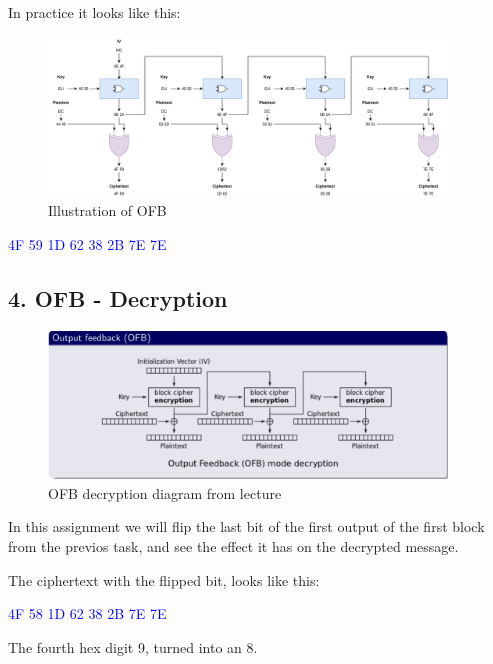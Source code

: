 \documentclass{article}
\begin{document}
In practice it looks like this:
\begin{figure}[H]
 \centering
  \includegraphics[width=300pt]{img/OFB.png}
 \caption{Illustration of OFB}
 \end{figure}

\begin{tcolorbox}
\begin{center}
\textcolor{blue}{
\qquad 4F 59 1D 62 38 2B 7E 7E}
\end{center}
\end{tcolorbox}


\newpage
\subsection{4. OFB - Decryption}

\begin{figure}[H]
 \centering
  \includegraphics[width=300pt]{img/ofbDeLecture.png}
 \caption{OFB decryption diagram from lecture}
 \end{figure}

In this assignment we will flip the last bit of the first output of the first block from the previos task, and see the effect it has on the decrypted message. 

The ciphertext with the flipped bit, looks like this: 
\begin{tcolorbox}
\begin{center}
\textcolor{blue}{
\qquad 4F 58 1D 62 38 2B 7E 7E}
\end{center}
\end{tcolorbox}
The fourth hex digit 9, turned into an 8.
\end{document}
